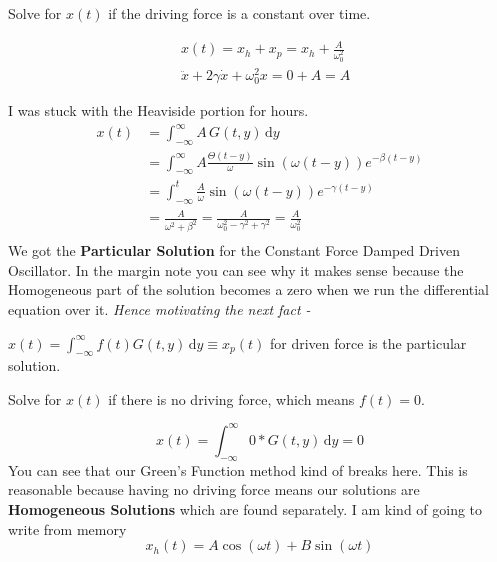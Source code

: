 \documentclass[10pt]{article}
\begin{document}
\begin{prob}
	Solve for $x(t)$ if the driving force is a constant over time. 
\end{prob}
\begin{margintable}
	\begin{align*}
		&x(t) = x_h + x_p = x_h + \frac{A}{\omega_0^2} \\ 
		&\ddot{x}  + 2 \gamma \dot{x} + \omega_0^2 x = 0 + A = A
	\end{align*}
\end{margintable}
\begin{solu}
I was stuck with the Heaviside portion for hours. 
	\begin{align*} x(t) &= 
		\int_{-\infty}^{\infty} A \, G(t,y) \, \mathrm{d} y \\ 
		&=
		\int_{-\infty}^{\infty} A \frac{\Theta(t-y)}{\omega}\sin(\omega (t-y) ) e^{- \beta (t - y)}  \\ 
		&= 
		\int_{-\infty}^{t}  \frac{A}{\omega}\sin(\omega (t-y) ) e^{- \gamma (t - y)} 
		\tag{$\Theta(t-y)$ ensures $t \ge y$ upper bound}
		\\ 
		&= \frac{A}{\omega^2 + \beta^2} = \frac{A}{\omega_0^2 - \gamma^2 + \gamma^2} = \frac{A}{\omega_0^2} \tag{used integral calculator}\\
	\end{align*}
	We got the \textbf{Particular Solution} for the Constant Force Damped Driven Oscillator. In the margin note you can see why it makes sense because the Homogeneous part of the solution becomes a zero when we run the differential equation over it. \emph{Hence motivating the next fact -}
\end{solu}

\begin{fact}\label{fcteqng}
	$x(t) = \int_{-\infty}^{\infty} f(t) G(t,y) \, \mathrm{d} y \equiv x_p(t)  $ for driven force is the particular solution. 
\end{fact}

\begin{prob}
	Solve for $x(t)$ if there is no driving force, which means $f(t) = 0$.
\end{prob}
\begin{solu}
	\[
	x(t) = \int_{-\infty}^{\infty} 0* G(t,y) \, \mathrm{d} y  = 0
	\]
	You can see that our Green's Function method kind of breaks here. This is reasonable because having no driving force means our solutions are \textbf{Homogeneous Solutions} which are found separately.
	I am kind of going to write from memory 
	\[
	x_h(t) = A \cos( \omega t ) + B \sin( \omega t)
	\] 
\end{solu}
\end{document}
